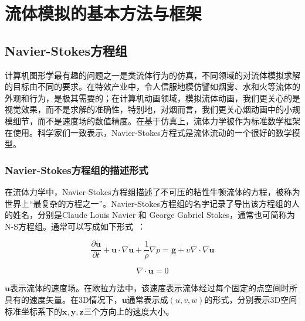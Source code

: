 
\chapter{流体模拟的基本方法与框架}
\label{chap:fluidSimulation}

\section{Navier-Stokes方程组}
\label{sec:navier-stokes}

计算机图形学最有趣的问题之一是类流体行为的仿真，不同领域的对流体模拟求解的目标由不同的要求。在特效产业中，令人信服地模仿譬如烟雾、水和火等流体的外观和行为，是极其需要的；在计算机动画领域，模拟流体动画，我们更关心的是视觉效果，而不是求解的准确性，特别地，对烟而言，我们更关心烟动画中的小规模细节，而不是速度场的数值精度。在基于仿真上，流体力学被作为标准数学框架在使用。科学家们一致表示，Navier-Stokes方程式是流体流动的一个很好的数学模型。

\subsection{Navier-Stokes方程组的描述形式}

在流体力学中，Navier-Stokes方程组描述了不可压的粘性牛顿流体的方程，被称为世界上“最复杂的方程之一”。Navier-Stokes方程组的名字记录了导出该方程组的人的姓名，分别是Claude Louis Navier 和 George Gabriel Stokes，通常也可简称为N-S方程组。通常可以写成如下形式~\cite{bridson2007fluid}：

\begin{equation}
\label{basicEq}
 \frac{\partial \boldsymbol u}{\partial t} + {\boldsymbol u} \cdot \nabla {\boldsymbol u} + \frac{1}{\rho} \nabla p= {\boldsymbol g} + \upsilon \nabla \cdot \nabla {\boldsymbol u}
\end{equation}

\begin{equation}
\label{imcompressible}
 \nabla \cdot {\boldsymbol u} = 0
\end{equation}
 
\(\boldsymbol u\)表示流体的速度场。在欧拉方法中，该速度表示流体经过每个固定的点空间时所具有的速度矢量。在3D情况下，\(\boldsymbol u\)通常表示成\((u,v,w)\)的形式，分别表示3D空间标准坐标系下的\(\boldsymbol{x}, \boldsymbol{y}, \boldsymbol{z}\)三个方向上的速度大小。
 
